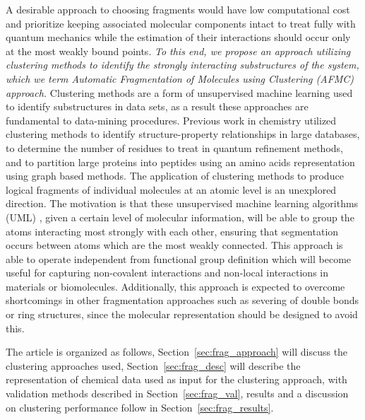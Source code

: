 A desirable approach to choosing fragments would have low computational cost and prioritize keeping associated molecular components intact to treat fully with quantum mechanics while the estimation of their interactions should occur only at the most weakly bound points. 
\textit{To this end, we propose an approach utilizing clustering methods to identify the strongly interacting substructures of the system, which we term Automatic Fragmentation of Molecules using Clustering (AFMC) approach.}
Clustering methods are a form of unsupervised machine learning used to identify substructures in data sets, as a result these approaches are fundamental to data-mining procedures.
Previous work in chemistry utilized clustering methods to identify structure-property relationships in large databases\autocite{Huan2016}, to determine the number of residues to treat in quantum refinement methods\autocite{zheng_solving_2017}, and to partition large proteins into peptides using an amino acids representation using graph based methods.\autocite{10.1021/acs.jctc.0c01054}
The application of clustering methods to produce logical fragments of individual molecules at an atomic level is an unexplored direction.
The motivation is that these unsupervised machine learning algorithms (UML) , given a certain level of molecular information, will be able to group the atoms interacting most strongly with each other, ensuring that segmentation occurs between atoms which are the most weakly connected. 
This approach is able to operate independent from functional group definition which will become useful for capturing non-covalent interactions and non-local interactions in materials or biomolecules.
Additionally, this approach is expected to overcome shortcomings in other fragmentation approaches such as severing of double bonds or ring structures, since the molecular representation should be designed to avoid this.

The article is organized as follows, Section~\ref{sec:frag_approach} will discuss the clustering approaches used, Section~\ref{sec:frag_desc} will describe the representation of chemical data used as input for the clustering approach, with validation methods described in Section~\ref{sec:frag_val}, results and a discussion on clustering performance follow in Section~\ref{sec:frag_results}. 
